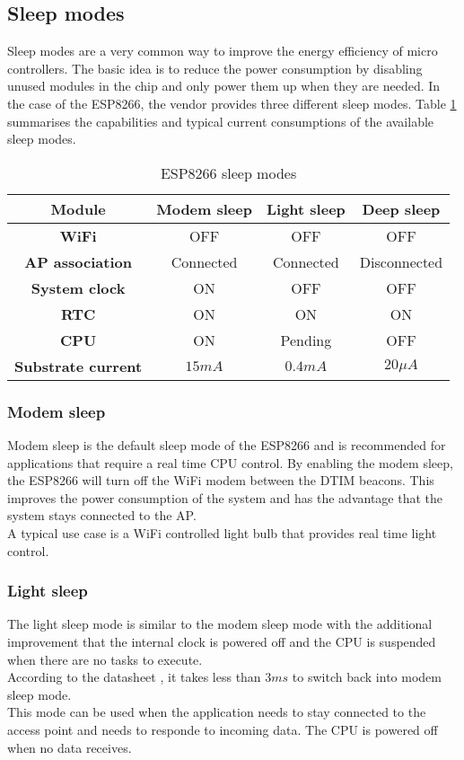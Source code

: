 \subsection{Sleep modes}
Sleep modes are a very common way to improve the energy efficiency of micro controllers.
The basic idea is to reduce the power consumption by disabling unused modules in the chip and only power them up when they are needed.
In the case of the ESP8266, the vendor provides three different sleep modes. 
Table \ref{tab_sleep_modes} summarises the capabilities and typical current consumptions of the available sleep modes.
\cite{mesquita_assessing_2018}

\begin{table}[htbp]
\caption{ESP8266 sleep modes}
\begin{center}
\begin{tabular}{|c|c|c|c|}
\hline
\textbf{Module}&\textbf{Modem sleep}&\textbf{Light sleep}&\textbf{Deep sleep}\\
\hline
\textbf{WiFi} & OFF & OFF & OFF\\
\textbf{AP association} & Connected & Connected & Disconnected\\
\textbf{System clock} & ON & OFF & OFF\\
\textbf{RTC} & ON & ON & ON\\
\textbf{CPU} & ON & Pending & OFF\\
\hline
\textbf{Substrate current} & $15mA$ & $0.4mA$ & $20\mu A$\\
\hline
\end{tabular}
\label{tab_sleep_modes}
\end{center}
\end{table}

\subsubsection{Modem sleep} \label{sec:modem_sleep}
Modem sleep is the default sleep mode of the ESP8266 and is recommended for applications that require a real time CPU control. \cite{mesquita_assessing_2018}
By enabling the modem sleep, the ESP8266 will turn off the WiFi modem between the DTIM beacons. 
This improves the power consumption of the system and has the advantage that the system stays connected to the AP.\\
A typical use case is a WiFi controlled light bulb that provides real time light control.\cite{espressif_inc_esp8266_2016}

\subsubsection{Light sleep} \label{sec:light_sleep}
The light sleep mode is similar to the modem sleep mode with the additional improvement that the internal clock is powered off and the CPU is suspended when there are no tasks to execute.\\
According to the datasheet \cite{espressif_inc_esp8266_2016}, it takes less than $3ms$ to switch back into modem sleep mode.\\
This mode can be used when the application needs to stay connected to the access point 
and needs to responde to incoming data. The CPU is powered off when no data receives.

